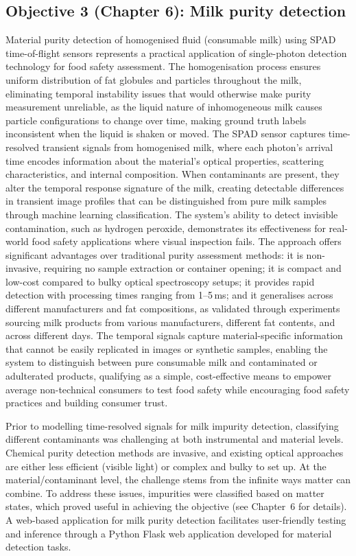 \documentclass[12pt,a4paper,oneside]{report}
\begin{document}
\subsection{Objective 3 (Chapter 6): Milk purity detection}
Material purity detection of homogenised fluid (consumable milk) using SPAD time-of-flight sensors represents a practical application of single-photon detection technology for food safety assessment. The homogenisation process ensures uniform distribution of fat globules and particles throughout the milk, eliminating temporal instability issues that would otherwise make purity measurement unreliable, as the liquid nature of inhomogeneous milk causes particle configurations to change over time, making ground truth labels inconsistent when the liquid is shaken or moved. The SPAD sensor captures time-resolved transient signals from homogenised milk, where each photon's arrival time encodes information about the material's optical properties, scattering characteristics, and internal composition. When contaminants are present, they alter the temporal response signature of the milk, creating detectable differences in transient image profiles that can be distinguished from pure milk samples through machine learning classification. The system's ability to detect invisible contamination, such as hydrogen peroxide, demonstrates its effectiveness for real-world food safety applications where visual inspection fails. The approach offers significant advantages over traditional purity assessment methods: it is non-invasive, requiring no sample extraction or container opening; it is compact and low-cost compared to bulky optical spectroscopy setups; it provides rapid detection with processing times ranging from 1--5\,ms; and it generalises across different manufacturers and fat compositions, as validated through experiments sourcing milk products from various manufacturers, different fat contents, and across different days. The temporal signals capture material-specific information that cannot be easily replicated in images or synthetic samples, enabling the system to distinguish between pure consumable milk and contaminated or adulterated products, qualifying as a simple, cost-effective means to empower average non-technical consumers to test food safety while encouraging food safety practices and building consumer trust.

Prior to modelling time-resolved signals for milk impurity detection, classifying different contaminants was challenging at both instrumental and material levels. Chemical purity detection methods are invasive, and existing optical approaches are either less efficient (visible light) or complex and bulky to set up. At the material/contaminant level, the challenge stems from the infinite ways matter can combine. To address these issues, impurities were classified based on matter states, which proved useful in achieving the objective (see Chapter~6 for details). A web-based application for milk purity detection facilitates user-friendly testing and inference through a Python Flask web application developed for material detection tasks.
\end{document}
